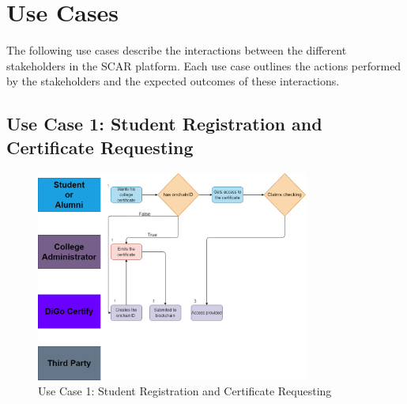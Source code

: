 \section{Use Cases}\label{sec:use-cases}

The following use cases describe the interactions between the different stakeholders in the SCAR platform. Each use case outlines the actions performed by the stakeholders and the expected outcomes of these interactions.

\subsection{Use Case 1: Student Registration and Certificate Requesting}

\begin{figure}[H]
    \centering
    \includegraphics[width=0.8\textwidth]{../diagrams/certificate-requesting.drawio.png}
    \caption{Use Case 1: Student Registration and Certificate Requesting}
    \label{fig:use-case-1}
\end{figure}

